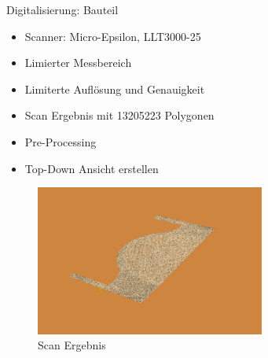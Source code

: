 \documentclass[../slides.tex]{subfiles}
\begin{document}
\begin{frame}{Digitalisierung: Bauteil}
    \begin{minipage}[]{.39\textwidth}
      \begin{itemize}
        \item Scanner: Micro-Epsilon, LLT3000-25
        \item Limierter Messbereich
        \item Limiterte Auflösung und Genauigkeit
        \item Scan Ergebnis mit 13205223 Polygonen
        \item Pre-Processing
        \item Top-Down Ansicht erstellen
      \end{itemize}
    \end{minipage}
    \hfill
    \begin{minipage}[]{.6\textwidth}
      \begin{figure}[]
        \includegraphics[height=140pt]{img_niklas/base_scan.png}
        \caption{Scan Ergebnis}
        \label{fig:base_scan}
      \end{figure}
    \end{minipage}
  \end{frame}
\end{document}
